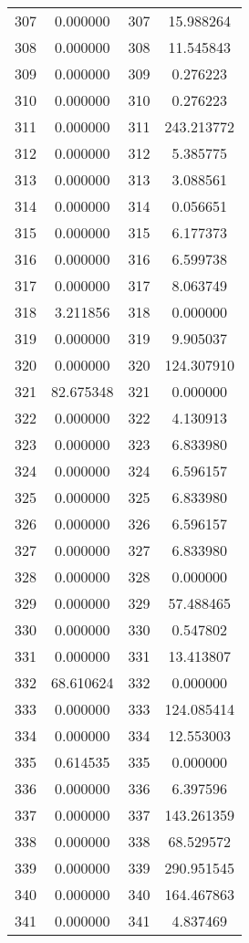\documentclass[12pt]{article}
\begin{document}
\begin{longtable}{@{}cccc@{}}
307 & 0.000000 & 307 & 15.988264 \\
308 & 0.000000 & 308 & 11.545843 \\
309 & 0.000000 & 309 & 0.276223 \\
310 & 0.000000 & 310 & 0.276223 \\
311 & 0.000000 & 311 & 243.213772 \\
312 & 0.000000 & 312 & 5.385775 \\
313 & 0.000000 & 313 & 3.088561 \\
314 & 0.000000 & 314 & 0.056651 \\
315 & 0.000000 & 315 & 6.177373 \\
316 & 0.000000 & 316 & 6.599738 \\
317 & 0.000000 & 317 & 8.063749 \\
318 & 3.211856 & 318 & 0.000000 \\
319 & 0.000000 & 319 & 9.905037 \\
320 & 0.000000 & 320 & 124.307910 \\
321 & 82.675348 & 321 & 0.000000 \\
322 & 0.000000 & 322 & 4.130913 \\
323 & 0.000000 & 323 & 6.833980 \\
324 & 0.000000 & 324 & 6.596157 \\
325 & 0.000000 & 325 & 6.833980 \\
326 & 0.000000 & 326 & 6.596157 \\
327 & 0.000000 & 327 & 6.833980 \\
328 & 0.000000 & 328 & 0.000000 \\
329 & 0.000000 & 329 & 57.488465 \\
330 & 0.000000 & 330 & 0.547802 \\
331 & 0.000000 & 331 & 13.413807 \\
332 & 68.610624 & 332 & 0.000000 \\
333 & 0.000000 & 333 & 124.085414 \\
334 & 0.000000 & 334 & 12.553003 \\
335 & 0.614535 & 335 & 0.000000 \\
336 & 0.000000 & 336 & 6.397596 \\
337 & 0.000000 & 337 & 143.261359 \\
338 & 0.000000 & 338 & 68.529572 \\
339 & 0.000000 & 339 & 290.951545 \\
340 & 0.000000 & 340 & 164.467863 \\
341 & 0.000000 & 341 & 4.837469 \\

\end{longtable}
\end{document}
